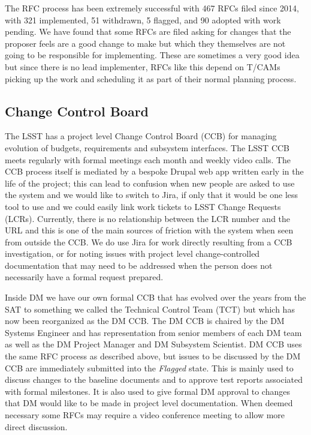 The RFC process has been extremely successful with 467 RFCs filed since 2014, with 321 implemented, 51 withdrawn, 5 flagged, and 90 adopted with work pending.
We have found that some RFCs are filed asking for changes that the proposer feels are a good change to make but which they themselves are not going to be responsible for implementing.
These are sometimes a very good idea but since there is no lead implementer, RFCs like this depend on T/CAMs picking up the work and scheduling it as part of their normal planning process.

\subsection{Change Control Board}
\label{sec:ccb}

The LSST has a project level Change Control Board (CCB) for managing evolution of budgets, requirements and subsystem interfaces.
The LSST CCB meets regularly with formal meetings each month and weekly video calls.
The CCB process itself is mediated by a bespoke Drupal web app written early in the life of the project; this can lead to confusion when new people are asked to use the system and we would like to switch to Jira, if only that it would be one less tool to use and we could easily link work tickets to LSST Change Requests (LCRs).
Currently, there is no relationship between the LCR number and the URL and this is one of the main sources of friction with the system when seen from outside the CCB.
We do use Jira for work directly resulting from a CCB investigation, or for noting issues with project level change-controlled documentation that may need to be addressed when the person does not necessarily have a formal request prepared.

Inside DM we have our own formal CCB that has evolved over the years from the SAT to something we called the Technical Control Team (TCT) but which has now been reorganized as the DM CCB.
The DM CCB is chaired by the DM Systems Engineer and has representation from senior members of each DM team as well as the DM Project Manager and DM Subsystem Scientist.
DM CCB uses the same RFC process as described above, but issues to be discussed by the DM CCB are immediately submitted into the \emph{Flagged} state.
This is mainly used to discuss changes to the baseline documents and to approve test reports associated with formal milestones.
It is also used to give formal DM approval to changes that DM would like to be made in project level documentation.
When deemed necessary some RFCs may require a video conference meeting to allow more direct discussion.
